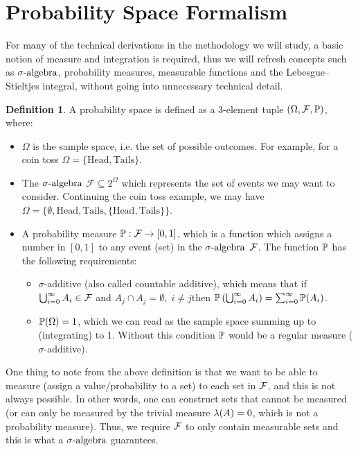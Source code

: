 \documentclass[a4paper,12pt,twoside,openright]{report}
\theoremstyle{definition}
\newtheorem{definition}{Definition}[section]
\begin{document}
\section{Probability Space Formalism}

For many of the technical derivations in the methodology we will study, a basic notion of measure and integration is required, thus we will refresh concepts such as $\sigalg$, probability measures,  measurable functions and the Lebesgue–Stieltjes integral, without going into unnecessary technical detail.

\begin{definition} \label{def:prob_space}
A probability space is defined as a 3-element tuple $\probspace$, where:
\begin{itemize}
    \item $\Omega$ is the sample space, i.e. the set of possible outcomes. For example, for a coin toss $\Omega=\{\text{Head}, \text{Tails}\}$. 
    \item The $\sigalg$ $\mathcal{F} \subseteq 2^{\Omega}$ which represents the set of events we may want to consider. Continuing the coin toss example, we may have $\Omega=\{\emptyset, \text{Head}, \text{Tails},\{\text{Head}, \text{Tails}\}\}$.
    \item A probability measure $\P:\calF \rightarrow [0,1]$, which is a function which assigns a number in $[0,1]$ to any event (set) in the $\sigalg$ $\calF$. The function $\P$ has the following requirements:
    \begin{itemize}
        \item $\sigma$-additive (also called countable additive), which means that if  $\bigcup_{i=0}^\infty  A_i\in \calF$ and $A_j \cap A_j = \emptyset, \; i \neq j$then $\P\left(\bigcup_{i=0}^\infty A_i\right) =\sum_{i=0}^\infty \P(A_i) $.
        \item $\P(\Omega)=1$, which we can read as the sample space summing up to (integrating) to 1.  Without this condition $\P$ would be a regular measure ($\sigma$-additive).
    \end{itemize}
\end{itemize}
\end{definition}
One thing to note from the above definition is that we want to be able to measure (assign a value/probability to a set) to each set in $\calF$, and this is not always possible. In other words, one can construct sets that cannot be measured (or can only be measured by the trivial measure $\callambda(A) = 0$, which is not a probability measure). Thus, we require $\calF$ to only contain measurable sets and this is what a $\sigalg$ guarantees.
\end{document}
